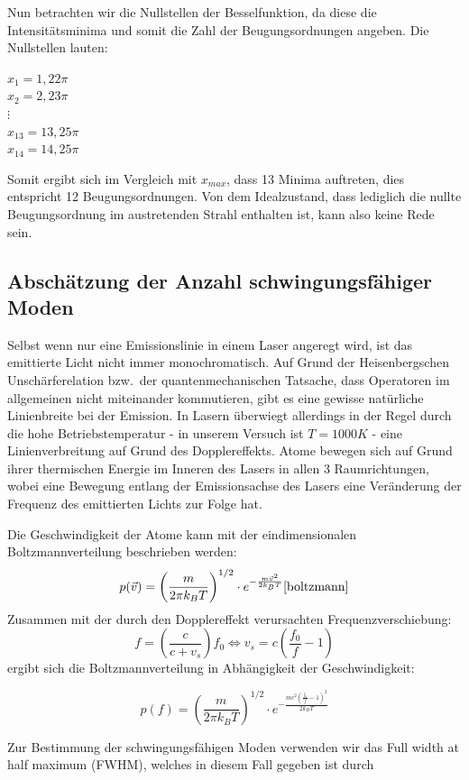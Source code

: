 \documentclass[bigchapter,colorback,accentcolor=tud4b,linedtoc,11pt]{tudreport}
\begin{document}
Nun betrachten wir die Nullstellen der Besselfunktion, da diese die Intensitätsminima und somit die Zahl der Beugungsordnungen angeben. Die Nullstellen lauten: 

\begin{center}
$x_1 = 1,22 \pi$     \\
$x_2 = 2,23 \pi$     \\
$\vdots$             \\
$x_{13} = 13,25 \pi$ \\
$x_{14} = 14,25 \pi$
\end{center}

Somit ergibt sich im Vergleich mit $x_{max}$, dass 13 Minima auftreten, dies entspricht 12 Beugungsordnungen. Von dem Idealzustand, dass lediglich die nullte Beugungsordnung im austretenden Strahl enthalten ist, kann also keine Rede sein.

\subsection{Abschätzung der Anzahl schwingungsfähiger Moden}
Selbst wenn nur eine Emissionslinie in einem Laser angeregt wird, ist das
emittierte Licht nicht immer monochromatisch. Auf Grund der Heisenbergschen
Unschärferelation bzw.\ der quantenmechanischen Tatsache, dass Operatoren im
allgemeinen nicht miteinander kommutieren, gibt es eine gewisse natürliche
Linienbreite bei der Emission. In Lasern überwiegt allerdings in der Regel durch
die hohe Betriebstemperatur - in unserem Versuch ist $T = 1000K$ - eine
Linienverbreitung auf Grund des Dopplereffekts. Atome bewegen sich auf Grund
ihrer thermischen Energie im Inneren des Lasers in allen 3 Raumrichtungen, wobei
eine Bewegung entlang der Emissionsachse des Lasers eine Veränderung der
Frequenz des emittierten Lichts zur Folge hat.

Die Geschwindigkeit der Atome kann mit der eindimensionalen Boltzmannverteilung
beschrieben werden:
$$p(\vec{v}) = \left(\frac{m}{2\pi k_B T}\right)^{1/2} \cdot e^{-\frac{m
    \vec{v}^2}{2k_B T}} \cite{boltzmann}$$
Zusammen mit der durch den Dopplereffekt verursachten Frequenzverschiebung:
$$f = \left ( \frac {c}{c + v_{s}} \right ) f_0 \Leftrightarrow v_s=c\left( \frac{f_0}{f}-1 \right)$$
ergibt sich die Boltzmannverteilung in Abhängigkeit der Geschwindigkeit:

$$p(f) = \left(\frac{m}{2\pi k_B T}\right)^{1/2} \cdot e^{-\frac{m
    c^2\left( \frac{f_0}{f}-1 \right)^2}{2k_B T}}$$

Zur Bestimmung der schwingungsfähigen Moden verwenden wir das Full width at half
maximum (FWHM), welches in diesem Fall gegeben ist durch 
\end{document}
